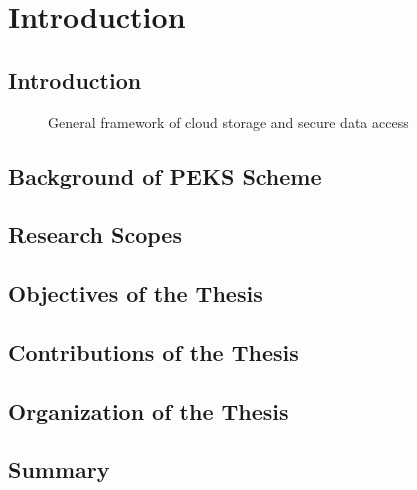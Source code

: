 %

\chapter[Introduction]{Introduction}
\label{chp1}
\section{Introduction}
\label{chp1.1}
\begin{figure}[!htb]
\begin{center}  
\caption{General framework of cloud storage and secure data access}
\label{Fig1(Chp1)}
\end{center}
\end{figure}


\section{Background of PEKS Scheme}
\label{chp1.2}

\section{Research Scopes}

\section{Objectives of the Thesis}


\section{Contributions of the Thesis}

\section{Organization of the Thesis}

\section{Summary}
